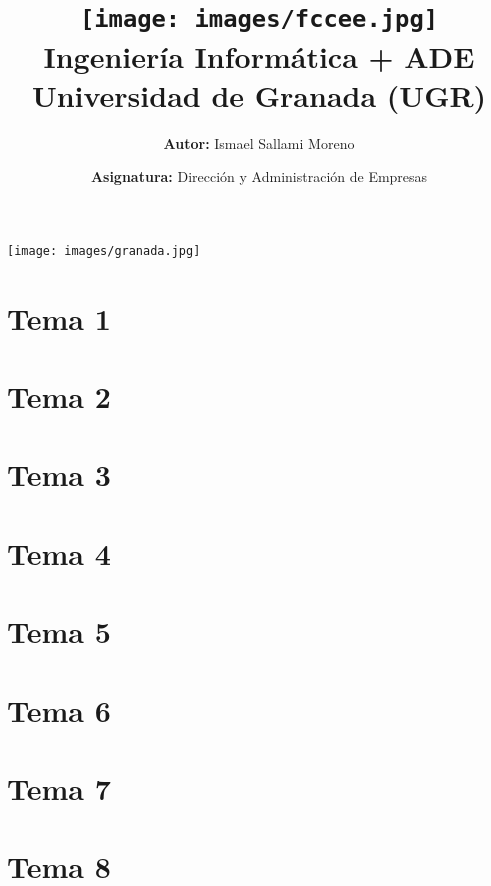 \documentclass[a4paper,12pt]{article}
\title{
    \vspace{-2cm}
    \texttt{[image: images/fccee.jpg]} \\ %
    \LARGE Ingeniería Informática + ADE\\
    \large Universidad de Granada (UGR)\\[1cm]
}
\author{\textbf{Autor:} Ismael Sallami Moreno}
\date{\textbf{Asignatura:} Dirección y Administración de Empresas}
\begin{document}
\maketitle
\thispagestyle{empty}

\begin{center}
    \texttt{[image: images/granada.jpg]} \\ %
    \vfill
\end{center}

\newpage

\tableofcontents
\newpage

\section{Tema 1}


\section{Tema 2}


\section{Tema 3}


\section{Tema 4}


\section{Tema 5}


\section{Tema 6}


\section{Tema 7}


\section{Tema 8}

\end{document}

